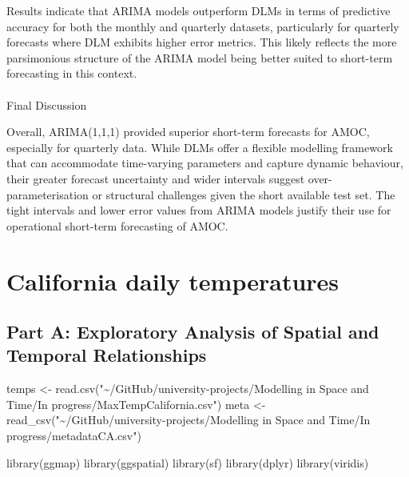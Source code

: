 \documentclass[
  11pt,
]{article}
\makeatletter
\let\oldparagraph\paragraph
\renewcommand{\paragraph}{
    \@ifstar
      \xxxParagraphStar
      \xxxParagraphNoStar
  }
\newcommand{\xxxParagraphStar}[1]{\oldparagraph*{#1}\mbox{}}
\newcommand{\xxxParagraphNoStar}[1]{\oldparagraph{#1}\mbox{}}
\newenvironment{Shaded}{\begin{snugshade}}{\end{snugshade}}
\newcommand{\FunctionTok}[1]{\textcolor[rgb]{0.28,0.35,0.67}{#1}}
\newcommand{\NormalTok}[1]{\textcolor[rgb]{0.00,0.23,0.31}{#1}}
\newcommand{\OtherTok}[1]{\textcolor[rgb]{0.00,0.23,0.31}{#1}}
\newcommand{\StringTok}[1]{\textcolor[rgb]{0.13,0.47,0.30}{#1}}
\makeatother
\begin{document}
Results indicate that ARIMA models outperform DLMs in terms of
predictive accuracy for both the monthly and quarterly datasets,
particularly for quarterly forecasts where DLM exhibits higher error
metrics. This likely reflects the more parsimonious structure of the
ARIMA model being better suited to short-term forecasting in this
context.

\paragraph{Final Discussion}\label{final-discussion}

Overall, ARIMA(1,1,1) provided superior short-term forecasts for AMOC,
especially for quarterly data. While DLMs offer a flexible modelling
framework that can accommodate time-varying parameters and capture
dynamic behaviour, their greater forecast uncertainty and wider
intervals suggest over-parameterisation or structural challenges given
the short available test set. The tight intervals and lower error values
from ARIMA models justify their use for operational short-term
forecasting of AMOC.

\newpage

\section{California daily
temperatures}\label{california-daily-temperatures}

\subsection{Part A: Exploratory Analysis of Spatial and Temporal
Relationships}\label{part-a-exploratory-analysis-of-spatial-and-temporal-relationships}

\begin{Shaded}
\begin{Highlighting}[]
\NormalTok{temps }\OtherTok{\textless{}{-}} \FunctionTok{read.csv}\NormalTok{(}\StringTok{"\textasciitilde{}/GitHub/university{-}projects/Modelling in Space and Time/In progress/MaxTempCalifornia.csv"}\NormalTok{)}
\NormalTok{meta }\OtherTok{\textless{}{-}} \FunctionTok{read\_csv}\NormalTok{(}\StringTok{"\textasciitilde{}/GitHub/university{-}projects/Modelling in Space and Time/In progress/metadataCA.csv"}\NormalTok{)}

\FunctionTok{library}\NormalTok{(ggmap)}
\FunctionTok{library}\NormalTok{(ggspatial)}
\FunctionTok{library}\NormalTok{(sf)}
\FunctionTok{library}\NormalTok{(dplyr)}
\FunctionTok{library}\NormalTok{(viridis)}
\end{Highlighting}
\end{Shaded}
\end{document}
